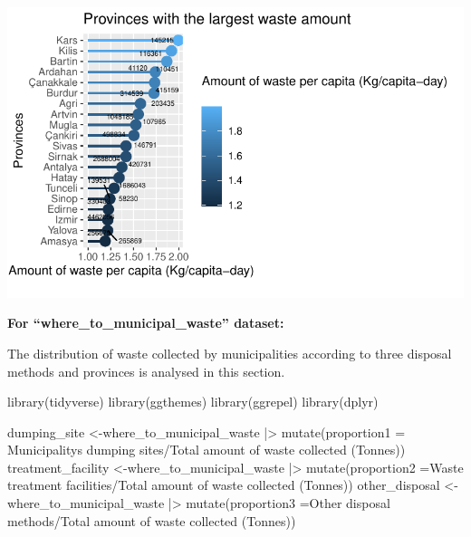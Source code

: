 \documentclass[
  11pt,
  a4paper,
  DIV=11,
  numbers=noendperiod]{scrartcl}
\newenvironment{Shaded}{\begin{snugshade}}{\end{snugshade}}
\newcommand{\AttributeTok}[1]{\textcolor[rgb]{0.40,0.45,0.13}{#1}}
\newcommand{\FunctionTok}[1]{\textcolor[rgb]{0.28,0.35,0.67}{#1}}
\newcommand{\NormalTok}[1]{\textcolor[rgb]{0.00,0.23,0.31}{#1}}
\newcommand{\OtherTok}[1]{\textcolor[rgb]{0.00,0.23,0.31}{#1}}
\newcommand{\SpecialCharTok}[1]{\textcolor[rgb]{0.37,0.37,0.37}{#1}}
\newcommand{\StringTok}[1]{\textcolor[rgb]{0.13,0.47,0.30}{#1}}
\begin{document}
\includegraphics{project_files/figure-pdf/unnamed-chunk-15-1.pdf}

{\textbf{For ``where\_to\_municipal\_waste'' dataset:}}

The distribution of waste collected by municipalities according to three
disposal methods and provinces is analysed in this section.

\begin{Shaded}
\begin{Highlighting}[]
\FunctionTok{library}\NormalTok{(tidyverse)}
\FunctionTok{library}\NormalTok{(ggthemes)}
\FunctionTok{library}\NormalTok{(ggrepel)}
\FunctionTok{library}\NormalTok{(dplyr)}

\NormalTok{dumping\_site }\OtherTok{\textless{}{-}}\NormalTok{where\_to\_municipal\_waste }\SpecialCharTok{|\textgreater{}} 
  \FunctionTok{mutate}\NormalTok{(}\AttributeTok{proportion1 =} \StringTok{\textasciigrave{}}\AttributeTok{Municipality\textquotesingle{}s dumping sites}\StringTok{\textasciigrave{}}\SpecialCharTok{/}\StringTok{\textasciigrave{}}\AttributeTok{Total amount of waste collected  (Tonnes)}\StringTok{\textasciigrave{}}\NormalTok{)}
\NormalTok{treatment\_facility }\OtherTok{\textless{}{-}}\NormalTok{where\_to\_municipal\_waste }\SpecialCharTok{|\textgreater{}} 
  \FunctionTok{mutate}\NormalTok{(}\AttributeTok{proportion2 =}\StringTok{\textasciigrave{}}\AttributeTok{Waste treatment facilities}\StringTok{\textasciigrave{}}\SpecialCharTok{/}\StringTok{\textasciigrave{}}\AttributeTok{Total amount of waste collected  (Tonnes)}\StringTok{\textasciigrave{}}\NormalTok{)}
\NormalTok{other\_disposal }\OtherTok{\textless{}{-}}\NormalTok{where\_to\_municipal\_waste }\SpecialCharTok{|\textgreater{}} 
  \FunctionTok{mutate}\NormalTok{(}\AttributeTok{proportion3 =}\StringTok{\textasciigrave{}}\AttributeTok{Other disposal methods}\StringTok{\textasciigrave{}}\SpecialCharTok{/}\StringTok{\textasciigrave{}}\AttributeTok{Total amount of waste collected  (Tonnes)}\StringTok{\textasciigrave{}}\NormalTok{)}
\end{Highlighting}
\end{Shaded}
\end{document}
